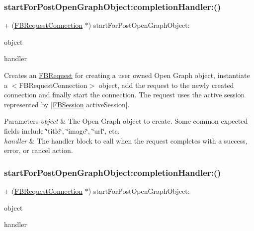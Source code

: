\subsubsection{\texorpdfstring{start\+For\+Post\+Open\+Graph\+Object\+:completion\+Handler\+:()}{startForPostOpenGraphObject:completionHandler:()}\hspace{0.1cm}{\footnotesize\ttfamily [1/5]}}
{\footnotesize\ttfamily + (\hyperlink{interfaceFBRequestConnection}{F\+B\+Request\+Connection} $\ast$) start\+For\+Post\+Open\+Graph\+Object\+: \begin{DoxyParamCaption}\item[{(id$<$ \hyperlink{protocolFBOpenGraphObject-p}{F\+B\+Open\+Graph\+Object} $>$)}]{object }\item[{completionHandler:(F\+B\+Request\+Handler)}]{handler }\end{DoxyParamCaption}}

Creates an {\ttfamily \hyperlink{interfaceFBRequest}{F\+B\+Request}} for creating a user owned Open Graph object, instantiate a $<$\+F\+B\+Request\+Connection$>$ object, add the request to the newly created connection and finally start the connection. The request uses the active session represented by {\ttfamily \mbox{[}\hyperlink{interfaceFBSession}{F\+B\+Session} active\+Session\mbox{]}}.


\begin{DoxyParams}{Parameters}
{\em object} & The Open Graph object to create. Some common expected fields include \char`\"{}title\char`\"{}, \char`\"{}image\char`\"{}, \char`\"{}url\char`\"{}, etc.\\
\hline
{\em handler} & The handler block to call when the request completes with a success, error, or cancel action. \\
\hline
\end{DoxyParams}
\mbox{\label{interfaceFBRequestConnection_aa592bef80bf5a2450be91fc9538b65bd}} 
\subsubsection{\texorpdfstring{start\+For\+Post\+Open\+Graph\+Object\+:completion\+Handler\+:()}{startForPostOpenGraphObject:completionHandler:()}\hspace{0.1cm}{\footnotesize\ttfamily [2/5]}}
{\footnotesize\ttfamily + (\hyperlink{interfaceFBRequestConnection}{F\+B\+Request\+Connection} $\ast$) start\+For\+Post\+Open\+Graph\+Object\+: \begin{DoxyParamCaption}\item[{(id$<$ \hyperlink{protocolFBOpenGraphObject-p}{F\+B\+Open\+Graph\+Object} $>$)}]{object }\item[{completionHandler:(F\+B\+Request\+Handler)}]{handler }\end{DoxyParamCaption}}

